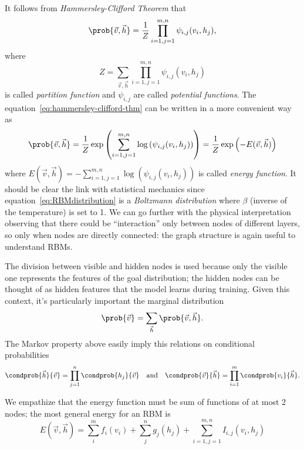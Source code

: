   
  It follows from \emph{Hammersley-Clifford Theorem}\cite{fischer2012introduction} that 
  \begin{equation} \label{eq:hammersley-clifford-thm}
    \prob{\vec{v}, \vec{h}} = \frac{1}{Z} \prod_{i=1,j=1}^{m,n} \psi_{i,j}(v_i, h_j),
  \end{equation}
  where
  \[Z = \sum_{\vec{v}, \vec{h}}\prod_{i=1,j=1}^{m,n} \psi_{i,j}(v_i, h_j)\]
  is called \emph{partition function} and \(\psi_{i,j}\) are called \emph{potential functions}.
  The equation~\eqref{eq:hammersley-clifford-thm} can be written in a more convenient way as
  \begin{equation} \label{eq:RBMdistribution}
    \prob{\vec{v}, \vec{h}} 
      = \frac{1}{Z} \exp\left(\sum_{i=1,j=1}^{m,n}\log\left(\psi_{i,j}(v_i, h_j)\right)\right)
      = \frac{1}{Z} \exp\left(-E(\vec{v}, \vec{h})\right)
  \end{equation}
  where \(E(\vec{v}, \vec{h})=-\sum_{i=1,j=1}^{m,n}\log\left(\psi_{i,j}(v_i, h_j)\right)\) is called
  \emph{energy function}. It should be clear the link with statistical mechanics since equation~\eqref{eq:RBMdistribution}
  is a \emph{Boltzmann distribution} where \(\beta\) (inverse of the temperature) is set to 1. 
  We can go further with the physical interpretation observing that there could be ``interaction''
  only between nodes of different layers, so only when nodes are directly connected: the graph
  structure is again useful to understand RBMs.
  
  The division between visible and hidden nodes is used because only the visible one represents the
  features of the goal distribution; the hidden nodes can be thought of as hidden features that
  the model learns during training. Given this context, it's particularly important the marginal
  distribution
  \[\prob{\vec{v}} = \sum_{\vec{h}} \prob{\vec{v},\vec{h}}.\]
  The Markov property above easily imply this relations on conditional probabilities
  \[
    \condprob{\vec{h}}{\vec{v}} = \prod_{j=1}^n \condprob{h_j}{\vec{v}} \quad\text{and}\quad
    \condprob{\vec{v}}{\vec{h}} = \prod_{i=1}^m \condprob{v_i}{\vec{h}}.
  \]
  
  We empathize that the energy function must be sum of functions of at most 2 nodes;
  the most general energy for an RBM is
  \begin{equation} \label{eq:energyRBM}
    E(\vec{v}, \vec{h}) = \sum_{i}^m f_i{(v_i)} + \sum_{j}^n g_j{(h_j)} +
                          \sum_{i=1,j=1}^{m,n} I_{i,j}{(v_i,h_j)}
  \end{equation}
  
